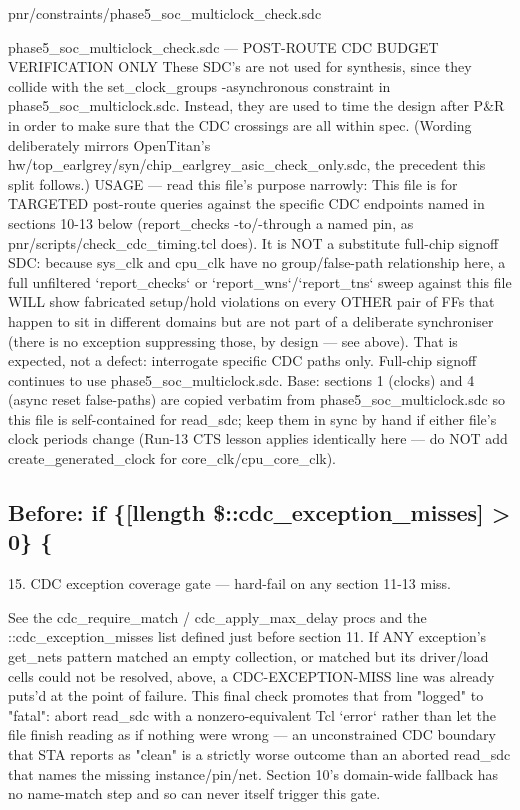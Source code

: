 \begin{relocated}{pnr/constraints/phase5_soc_multiclock_check.sdc}
\begin{textblock}
phase5_soc_multiclock_check.sdc — POST-ROUTE CDC BUDGET VERIFICATION ONLY
These SDC's are not used for synthesis, since they collide with the
set_clock_groups -asynchronous constraint in phase5_soc_multiclock.sdc.
Instead, they are used to time the design after P&R in order to make sure
that the CDC crossings are all within spec. (Wording deliberately mirrors
OpenTitan's hw/top_earlgrey/syn/chip_earlgrey_asic_check_only.sdc, the
precedent this split follows.)
USAGE — read this file's purpose narrowly:
  This file is for TARGETED post-route queries against the specific CDC
  endpoints named in sections 10-13 below (report_checks -to/-through a
  named pin, as pnr/scripts/check_cdc_timing.tcl does). It is NOT a
  substitute full-chip signoff SDC: because sys_clk and cpu_clk have no
  group/false-path relationship here, a full unfiltered `report_checks`
  or `report_wns`/`report_tns` sweep against this file WILL show
  fabricated setup/hold violations on every OTHER pair of FFs that
  happen to sit in different domains but are not part of a deliberate
  synchroniser (there is no exception suppressing those, by design — see
  above). That is expected, not a defect: interrogate specific CDC paths
  only. Full-chip signoff continues to use phase5_soc_multiclock.sdc.
Base: sections 1 (clocks) and 4 (async reset false-paths) are copied
verbatim from phase5_soc_multiclock.sdc so this file is self-contained
for read_sdc; keep them in sync by hand if either file's clock periods
change (Run-13 CTS lesson applies identically here — do NOT add
create_generated_clock for core_clk/cpu_core_clk).
\end{textblock}

\subsection*{Before: if \{[llength \$::cdc\_exception\_misses] > 0\} \{}

\begin{textblock}
15. CDC exception coverage gate — hard-fail on any section 11-13 miss.

See the cdc_require_match / cdc_apply_max_delay procs and the
::cdc_exception_misses list defined just before section 11. If ANY
exception's get_nets pattern matched an empty collection, or matched but
its driver/load cells could not be resolved, above, a CDC-EXCEPTION-MISS
line was already puts'd at the point of failure. This final check
promotes that from "logged" to "fatal": abort read_sdc with a
nonzero-equivalent Tcl `error` rather than let the file finish reading as
if nothing were wrong — an unconstrained CDC boundary that STA reports as
"clean" is a strictly worse outcome than an aborted read_sdc that names
the missing instance/pin/net. Section 10's domain-wide fallback has no
name-match step and so can never itself trigger this gate.
\end{textblock}

\end{relocated}

